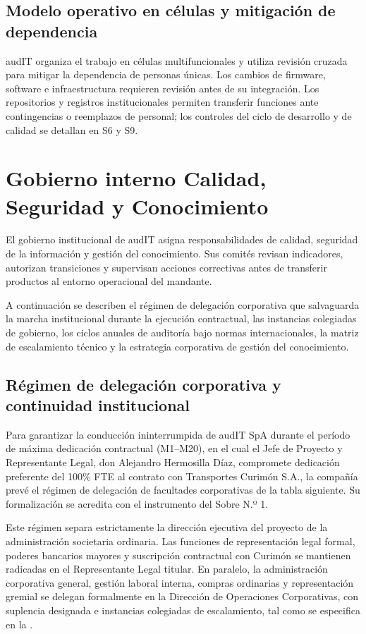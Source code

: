 \subsection{Modelo operativo en células y mitigación de dependencia}\label{sec:1-celulas}

audIT organiza el trabajo en células multifuncionales y utiliza revisión cruzada para mitigar la dependencia de personas únicas. Los cambios de firmware, software e infraestructura requieren revisión antes de su integración. Los repositorios y registros institucionales permiten transferir funciones ante contingencias o reemplazos de personal; los controles del ciclo de desarrollo y de calidad se detallan en S6 y S9.

\section{Gobierno interno Calidad, Seguridad y Conocimiento}\label{sec:1-gobierno}

El gobierno institucional de audIT asigna responsabilidades de calidad, seguridad de la información y gestión del conocimiento. Sus comités revisan indicadores, autorizan transiciones y supervisan acciones correctivas antes de transferir productos al entorno operacional del mandante.

A continuación se describen el régimen de delegación corporativa que salvaguarda la marcha institucional durante la ejecución contractual, las instancias colegiadas de gobierno, los ciclos anuales de auditoría bajo normas internacionales, la matriz de escalamiento técnico y la estrategia corporativa de gestión del conocimiento.

\subsection{Régimen de delegación corporativa y continuidad institucional}\label{sec:1-delegacion-corporativa}

Para garantizar la conducción ininterrumpida de audIT SpA durante el período de máxima dedicación contractual (M1--M20), en el cual el Jefe de Proyecto y Representante Legal, don Alejandro Hermosilla Díaz, compromete dedicación preferente del 100\% FTE al contrato con Transportes Curimón S.A., la compañía prevé el régimen de delegación de facultades corporativas de la tabla siguiente. Su formalización se acredita con el instrumento del Sobre N.º 1.

Este régimen separa estrictamente la dirección ejecutiva del proyecto de la administración societaria ordinaria. Las funciones de representación legal formal, poderes bancarios mayores y suscripción contractual con Curimón se mantienen radicadas en el Representante Legal titular. En paralelo, la administración corporativa general, gestión laboral interna, compras ordinarias y representación gremial se delegan formalmente en la Dirección de Operaciones Corporativas, con suplencia designada e instancias colegiadas de escalamiento, tal como se especifica en la .

